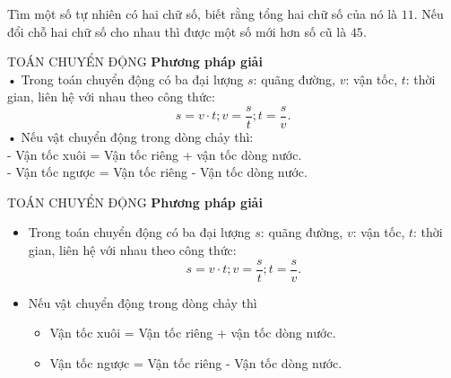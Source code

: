 \begin{vd}%
Tìm một số tự nhiên có hai chữ số, biết rằng tổng hai chữ số của nó là $11$. Nếu đổi chỗ hai chữ số cho nhau thì được một số mới hơn số cũ là $45$.
\end{vd}

\begin{dang}{TOÁN CHUYỂN ĐỘNG}
\textbf{Phương pháp giải}\\
• Trong toán chuyển động có ba đại lượng $s$: quãng đường, $v$: vận tốc, $t$: thời gian, liên hệ với nhau theo công thức:
\[s=v\cdot t; v=\dfrac{s}{t};t=\dfrac{s}{v}.\]
• Nếu vật chuyển động trong dòng chảy thì: \\
- Vận tốc xuôi =  Vận tốc riêng + vận tốc dòng nước. \\
- Vận tốc ngược = Vận tốc riêng - Vận tốc dòng nước.
\end{dang}

\begin{dang}{TOÁN CHUYỂN ĐỘNG}
	\textbf{Phương pháp giải}
	\begin{itemize}
		\item Trong toán chuyển động có ba đại lượng $s$: quãng đường, $v$: vận tốc, $t$: thời gian, liên hệ với nhau theo công thức:
		\[s=v\cdot t; v=\dfrac{s}{t};t=\dfrac{s}{v}.\]
		\item Nếu vật chuyển động trong dòng chảy thì
		\begin{itemize}
			\item Vận tốc xuôi =  Vận tốc riêng + vận tốc dòng nước.
			\item Vận tốc ngược = Vận tốc riêng - Vận tốc dòng nước.
		\end{itemize}
	\end{itemize}
\end{dang}

